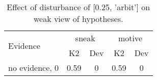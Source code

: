 \begin{table}\begin{tabular}{l|cc|cc}\toprule\multirow{2}{*}{Evidence} & \multicolumn{2}{c}{sneak}& \multicolumn{2}{c}{motive}\\& {K2} & {Dev}& {K2} & {Dev}\\\midrule
no evidence, 0 & \cellcolor{Bittersweet}0.59&\cellcolor{Bittersweet}0&\cellcolor{Bittersweet}0.59&\cellcolor{Bittersweet}0\\\bottomrule\end{tabular}\caption{Effect of disturbance of [0.25, 'arbit'] on weak view of hypotheses.}\end{table}